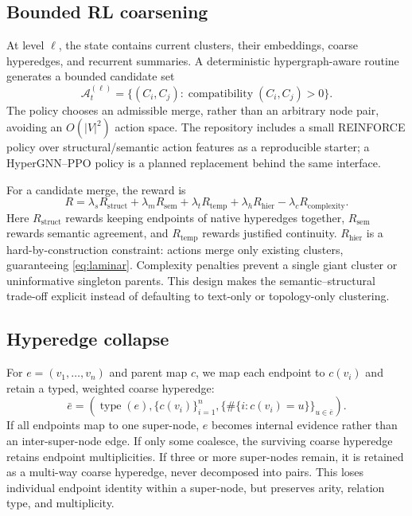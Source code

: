 \documentclass[11pt]{article}
\begin{document}
\subsection{Bounded RL coarsening}
At level $\ell$, the state contains current clusters, their embeddings, coarse hyperedges, and recurrent summaries. A deterministic hypergraph-aware routine generates a bounded candidate set
\begin{equation}
\mathcal A_t^{(\ell)}=\{(C_i,C_j):\operatorname{compatibility}(C_i,C_j)>0\}.
\end{equation}
The policy chooses an admissible merge, rather than an arbitrary node pair, avoiding an $O(|V|^2)$ action space. The repository includes a small REINFORCE policy over structural/semantic action features as a reproducible starter; a HyperGNN--PPO policy is a planned replacement behind the same interface.

For a candidate merge, the reward is
\begin{equation}
R=\lambda_sR_{\mathrm{struct}}+\lambda_mR_{\mathrm{sem}}+\lambda_tR_{\mathrm{temp}}+\lambda_hR_{\mathrm{hier}}-\lambda_cR_{\mathrm{complexity}}.
\label{eq:reward}
\end{equation}
Here $R_{\mathrm{struct}}$ rewards keeping endpoints of native hyperedges together, $R_{\mathrm{sem}}$ rewards semantic agreement, and $R_{\mathrm{temp}}$ rewards justified continuity. $R_{\mathrm{hier}}$ is a hard-by-construction constraint: actions merge only existing clusters, guaranteeing \cref{eq:laminar}. Complexity penalties prevent a single giant cluster or uninformative singleton parents. This design makes the semantic--structural trade-off explicit instead of defaulting to text-only or topology-only clustering.

\subsection{Hyperedge collapse}
For $e=(v_1,\ldots,v_n)$ and parent map $c$, we map each endpoint to $c(v_i)$ and retain a typed, weighted coarse hyperedge:
\begin{equation}
\bar e=(\operatorname{type}(e),\{c(v_i)\}_{i=1}^{n},\{\#\{i:c(v_i)=u\}\}_{u\in\bar e}).
\end{equation}
If all endpoints map to one super-node, $e$ becomes internal evidence rather than an inter-super-node edge. If only some coalesce, the surviving coarse hyperedge retains endpoint multiplicities. If three or more super-nodes remain, it is retained as a multi-way coarse hyperedge, never decomposed into pairs. This loses individual endpoint identity within a super-node, but preserves arity, relation type, and multiplicity.
\end{document}
